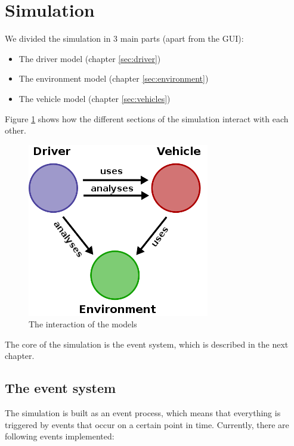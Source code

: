 
\section{Simulation}
\label{sec:simulation}

We divided the simulation in 3 main parts (apart from the GUI): \\

\begin{itemize}
\item The driver model (chapter \ref{sec:driver})
\item The environment model (chapter \ref{sec:environment})
\item The vehicle model (chapter \ref{sec:vehicles})
\end{itemize} 

\noindent Figure \ref{fig:simulationProcess} shows how the different sections
of the simulation interact with each other.

\begin{figure}[H]
\begin{center}
\includegraphics[scale=0.5]{images/process.png}
\end{center}
\caption{The interaction of the models}
\label{fig:simulationProcess}
\end{figure}

\noindent The core of the simulation is the event system, which is described in
the next chapter.

\subsection{The event system}
\label{sec:eventSystem}

The simulation is built as an event process, which means that everything is
triggered by events that occur on a certain point in time. Currently,
there are following events implemented:

